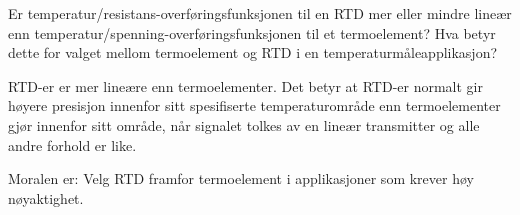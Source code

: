 
Er temperatur/resistans-overføringsfunksjonen til en RTD mer eller mindre lineær enn temperatur/spenning-overføringsfunksjonen til et termoelement? Hva betyr dette for valget mellom termoelement og RTD i en temperaturmåleapplikasjon?







RTD-er er mer lineære enn termoelementer. Det betyr at RTD-er normalt gir høyere presisjon innenfor sitt spesifiserte temperaturområde enn termoelementer gjør innenfor sitt område, når signalet tolkes av en lineær transmitter og alle andre forhold er like.







Moralen er: Velg RTD framfor termoelement i applikasjoner som krever høy nøyaktighet.


